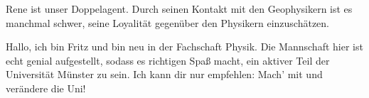 \begin{multicols*}{2}
{Rene ist unser Doppelagent. Durch seinen Kontakt mit den Geophysikern ist es manchmal schwer, seine Loyalität gegenüber den Physikern einzuschätzen.
\vspace{2\baselineskip}}

\vspace{3cm minus 3cm}
{Hallo, ich bin Fritz und bin neu in der Fachschaft Physik. Die Mannschaft hier ist echt genial aufgestellt, sodass es richtigen Spaß macht, ein aktiver Teil der Universität Münster zu sein. Ich kann dir nur empfehlen: Mach' mit und verändere die Uni!}
\end{multicols*}
